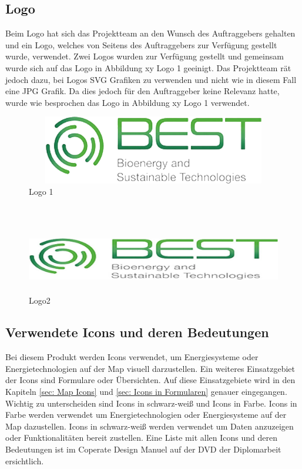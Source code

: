 \subsection{Logo}
Beim Logo hat sich das Projektteam an den Wunsch des Auftraggebers gehalten und ein Logo, welches von Seitens des Auftraggebers zur Verfügung gestellt wurde, verwendet. Zwei Logos wurden zur Verfügung gestellt und gemeinsam wurde sich auf das Logo in Abbildung xy Logo 1 geeinigt. Das Projektteam rät jedoch dazu, bei Logos SVG Grafiken zu verwenden und nicht wie in diesem Fall eine JPG Grafik. Da dies jedoch für den Auftraggeber keine Relevanz hatte, wurde wie besprochen das Logo in Abbildung xy Logo 1 verwendet.
\\
\begin{figure}[h]
	\centering
	\includegraphics[height=3cm,width=14cm]{images/Logo1}
	\caption{Logo 1}
	\label{fig: Logo1}
\end{figure}
\\
\begin{figure}[h]
	\centering
	\includegraphics[height=3cm,width=14cm]{images/Logo2}
	\caption{Logo2}
	\label{fig: Logo2}
\end{figure}

\newpage
\subsection{Verwendete Icons und deren Bedeutungen} \label{sec:Verwendete Icons und deren Bedeutungen}
Bei diesem Produkt werden Icons verwendet, um Energiesysteme oder Energietechnologien auf der Map visuell darzustellen. Ein weiteres Einsatzgebiet der Icons sind Formulare oder Übersichten. Auf diese Einsatzgebiete wird in den Kapiteln  \ref{sec: Map Icons} und \ref{sec: Icons in Formularen} genauer eingegangen. Wichtig zu unterscheiden sind Icons in schwarz-weiß und Icons in Farbe. Icons in Farbe werden verwendet um Energietechnologien oder Energiesysteme auf der Map dazustellen. Icons in schwarz-weiß werden verwendet um Daten anzuzeigen oder Funktionalitäten bereit zustellen.
Eine Liste mit allen Icons und deren Bedeutungen ist im Coperate Design Manuel auf der DVD der Diplomarbeit ersichtlich.




